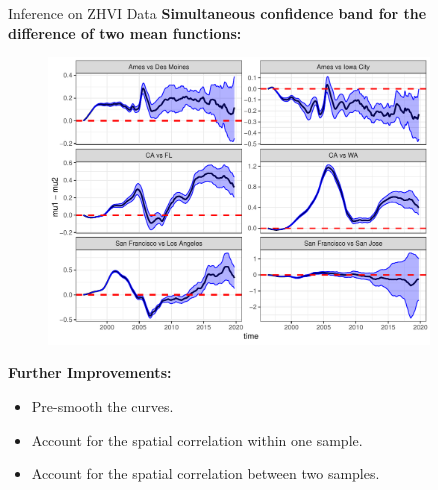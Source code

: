 \documentclass[final]{beamer}
\newlength{\sepwidth}
\newlength{\colwidth}
\newcommand{\separatorcolumn}{\begin{column}{\sepwidth}\end{column}}
\begin{document}
\begin{frame}[t]
\begin{columns}[t]
\begin{column}{\colwidth}
  \vspace{1em}


  \begin{block}{Inference on ZHVI Data}
\textbf{Simultaneous confidence band for the difference of two mean functions:}

\vspace{-1em}

 \begin{figure}[h]
\includegraphics[width=1.03\textwidth]{figure/scb.pdf}
\end{figure}
\vspace{-1em}

\textbf{Further Improvements:}
\begin{itemize}
\item Pre-smooth the curves.
\item Account for the spatial correlation within one sample.
\item Account for the spatial correlation between two samples.
\end{itemize}

  \end{block}





\end{column}




\separatorcolumn



\begin{column}{\colwidth}




\end{column}
\end{columns}
\end{frame}
\end{document}
